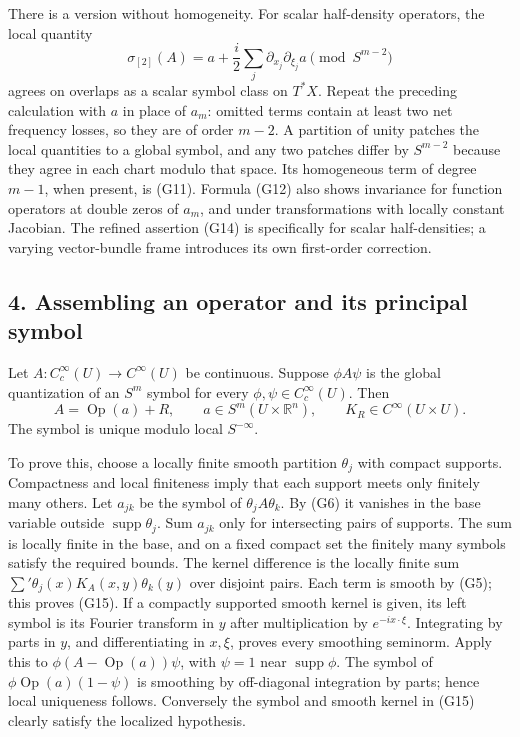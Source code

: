 \documentclass[
  11pt,
]{article}
\begin{document}
There is a version without homogeneity. For scalar half-density
operators, the local quantity \[
\sigma_{[2]}(A)=a+\frac i2\sum_j\partial_{x_j}\partial_{\xi_j}a
\pmod {S^{m-2}}
\tag{G14}
\] agrees on overlaps as a scalar symbol class on \(T^*X\). Repeat the
preceding calculation with \(a\) in place of \(a_m\): omitted terms
contain at least two net frequency losses, so they are of order \(m-2\).
A partition of unity patches the local quantities to a global symbol,
and any two patches differ by \(S^{m-2}\) because they agree in each
chart modulo that space. Its homogeneous term of degree \(m-1\), when
present, is (G11). Formula (G12) also shows invariance for function
operators at double zeros of \(a_m\), and under transformations with
locally constant Jacobian. The refined assertion (G14) is specifically
for scalar half-densities; a varying vector-bundle frame introduces its
own first-order correction.

\subsection{4. Assembling an operator and its principal
symbol}\label{assembling-an-operator-and-its-principal-symbol}

Let \(A:C_c^\infty(U)\to C^\infty(U)\) be continuous. Suppose
\(\phi A\psi\) is the global quantization of an \(S^m\) symbol for every
\(\phi,\psi\in C_c^\infty(U)\). Then \[
A=\operatorname{Op}(a)+R,\qquad a\in S^m(U\times\mathbb R^n),
\qquad K_R\in C^\infty(U\times U).
\tag{G15}
\] The symbol is unique modulo local \(S^{-\infty}\).

To prove this, choose a locally finite smooth partition \(\theta_j\)
with compact supports. Compactness and local finiteness imply that each
support meets only finitely many others. Let \(a_{jk}\) be the symbol of
\(\theta_jA\theta_k\). By (G6) it vanishes in the base variable outside
\(\operatorname{supp}\theta_j\). Sum \(a_{jk}\) only for intersecting
pairs of supports. The sum is locally finite in the base, and on a fixed
compact set the finitely many symbols satisfy the required bounds. The
kernel difference is the locally finite sum
\(\sum'\theta_j(x)K_A(x,y)\theta_k(y)\) over disjoint pairs. Each term
is smooth by (G5); this proves (G15). If a compactly supported smooth
kernel is given, its left symbol is its Fourier transform in \(y\) after
multiplication by \(e^{-ix\cdot\xi}\). Integrating by parts in \(y\),
and differentiating in \(x,\xi\), proves every smoothing seminorm. Apply
this to \(\phi(A-\operatorname{Op}(a))\psi\), with \(\psi=1\) near
\(\operatorname{supp}\phi\). The symbol of
\(\phi\operatorname{Op}(a)(1-\psi)\) is smoothing by off-diagonal
integration by parts; hence local uniqueness follows. Conversely the
symbol and smooth kernel in (G15) clearly satisfy the localized
hypothesis.
\end{document}

